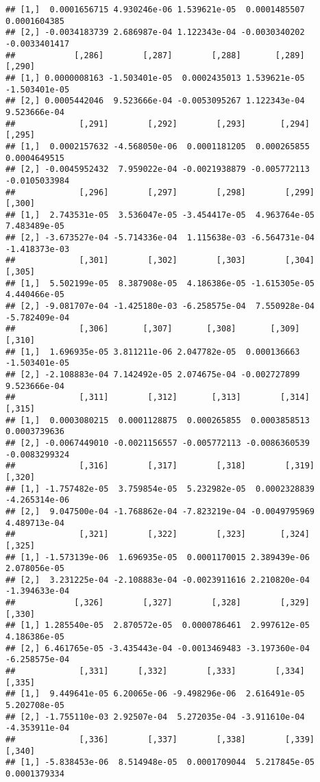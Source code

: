 \documentclass[
]{article}
\begin{document}
\begin{verbatim}
## [1,]  0.0001656715 4.930246e-06 1.539621e-05  0.0001485507  0.0001604385
## [2,] -0.0034183739 2.686987e-04 1.122343e-04 -0.0030340202 -0.0033401417
##            [,286]        [,287]        [,288]       [,289]        [,290]
## [1,] 0.0000008163 -1.503401e-05  0.0002435013 1.539621e-05 -1.503401e-05
## [2,] 0.0005442046  9.523666e-04 -0.0053095267 1.122343e-04  9.523666e-04
##             [,291]        [,292]        [,293]       [,294]        [,295]
## [1,]  0.0002157632 -4.568050e-06  0.0001181205  0.000265855  0.0004649515
## [2,] -0.0045952432  7.959022e-04 -0.0021938879 -0.005772113 -0.0105033984
##             [,296]        [,297]        [,298]        [,299]        [,300]
## [1,]  2.743531e-05  3.536047e-05 -3.454417e-05  4.963764e-05  7.483489e-05
## [2,] -3.673527e-04 -5.714336e-04  1.115638e-03 -6.564731e-04 -1.418373e-03
##             [,301]        [,302]        [,303]        [,304]        [,305]
## [1,]  5.502199e-05  8.387908e-05  4.186386e-05 -1.615305e-05  4.440466e-05
## [2,] -9.081707e-04 -1.425180e-03 -6.258575e-04  7.550928e-04 -5.782409e-04
##             [,306]       [,307]       [,308]       [,309]        [,310]
## [1,]  1.696935e-05 3.811211e-06 2.047782e-05  0.000136663 -1.503401e-05
## [2,] -2.108883e-04 7.142492e-05 2.074675e-04 -0.002727899  9.523666e-04
##             [,311]        [,312]       [,313]        [,314]        [,315]
## [1,]  0.0003080215  0.0001128875  0.000265855  0.0003858513  0.0003739636
## [2,] -0.0067449010 -0.0021156557 -0.005772113 -0.0086360539 -0.0083299324
##             [,316]        [,317]        [,318]        [,319]        [,320]
## [1,] -1.757482e-05  3.759854e-05  5.232982e-05  0.0002328839 -4.265314e-06
## [2,]  9.047500e-04 -1.768862e-04 -7.823219e-04 -0.0049795969  4.489713e-04
##             [,321]        [,322]        [,323]       [,324]        [,325]
## [1,] -1.573139e-06  1.696935e-05  0.0001170015 2.389439e-06  2.078056e-05
## [2,]  3.231225e-04 -2.108883e-04 -0.0023911616 2.210820e-04 -1.394633e-04
##            [,326]        [,327]        [,328]        [,329]        [,330]
## [1,] 1.285540e-05  2.870572e-05  0.0000786461  2.997612e-05  4.186386e-05
## [2,] 6.461765e-05 -3.435443e-04 -0.0013469483 -3.197360e-04 -6.258575e-04
##             [,331]      [,332]        [,333]        [,334]        [,335]
## [1,]  9.449641e-05 6.20065e-06 -9.498296e-06  2.616491e-05  5.202708e-05
## [2,] -1.755110e-03 2.92507e-04  5.272035e-04 -3.911610e-04 -4.353911e-04
##             [,336]        [,337]        [,338]        [,339]        [,340]
## [1,] -5.838453e-06  8.514948e-05  0.0001709044  5.217845e-05  0.0001379334

\end{verbatim}
\end{document}
